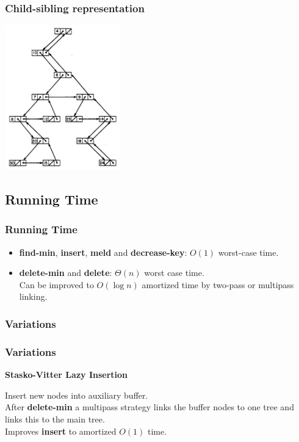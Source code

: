 \documentclass{beamer}
\begin{document}
\begin{frame}
\frametitle{Child-sibling representation}
\begin{center}
\includegraphics[width=5cm]{../pairing-heap-slides/fig3.png}
\end{center}

\end{frame}

\begin{frame}
\subsection{Running Time}
\frametitle{Running Time}

\begin{itemize}
\item \textbf{find-min}, \textbf{insert}, \textbf{meld} and \textbf{decrease-key}:
  $O(1)$ worst-case time.
\item \textbf{delete-min} and \textbf{delete}: $\Theta(n)$ worst case
  time.\\ Can be improved to $O(\log n)$ amortized time by two-pass or multipass linking.
\end{itemize}

\end{frame}

\begin{frame}
\frametitle{Variations}
\frametitle{Variations}

\textbf{Stasko-Vitter Lazy Insertion}

Insert new nodes into auxiliary buffer. \\
After \textbf{delete-min} a multipass strategy links the buffer
nodes to one tree and links this to the main tree.\\

Improves \textbf{insert} to amortized $O(1)$ time.

\end{frame}
\end{document}
